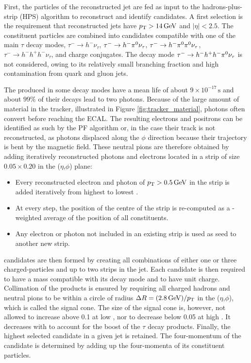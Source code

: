 First, the particles of the reconstructed jet are fed as input to the hadrons-plus-strip (HPS) algorithm \cite{tauh_reconstruction} to reconstruct and identify \tauh candidates. A first selection is the requirement that reconstructed jets have $p_{\mathrm{T}} > 14\,\mathrm{GeV}$ and $|\eta| < 2.5$.
The constituent particles are combined into \tauh candidates compatible with one of the main $\tau$ decay modes, $\tau^- \rightarrow h^- \nu_\tau$, $\tau^- \rightarrow h^- \pi^{0} \nu_\tau$, $\tau^- \rightarrow h^- \pi^{0} \pi^{0} \nu_\tau$, $\tau^- \rightarrow h^- h^+ h^- \nu_\tau$, and charge conjugates. The decay mode $\tau^- \rightarrow h^- h^+ h^- \pi^{0} \nu_\tau$ is not considered, owing to its relatively small branching fraction and high contamination from quark and gluon jets.

The \pizero produced in some decay modes have a mean life of about $9 \times 10^{-17}\,\mathrm{s}$ and about $99\%$ of their decays lead to two photons. Because of the large amount of material in the tracker, illustrated in Figure \ref{fig:tracker_material}, photons often convert before reaching the ECAL. The resulting electrons and positrons can be identified as such by the PF algorithm or, in the case their track is not reconstructed, as photons displaced along the $\phi$ direction because their trajectory is bent by the magnetic field.
These neutral pions are therefore obtained by adding iteratively reconstructed photons and electrons located in a strip of size $0.05 \times 0.20$ in the ($\eta$,$\phi$) plane:
\begin{itemize}
    \item Every reconstructed electron and photon of $p_{\mathrm{T}} > 0.5\,\mathrm{GeV}$ in the strip is added iteratively from highest to lowest \pt.
    \item At every step, the position of the centre of the strip is re-computed as a \pt-weighted average of the position of all constituents.
    \item Any electron or photon not included in an existing strip is used as seed to another new strip.
\end{itemize}

\tauh candidates are then formed by creating all combinations of either one or three charged-particles and up to two strips in the jet.
Each \tauh candidate is then required to have a mass compatible with its decay mode and to have unit charge.
Collimation of the products is ensured by requiring all charged hadrons and neutral pions to be within a circle of radius $\Delta R = (2.8\,\mathrm{GeV})/p_{\mathrm{T}}$ in the ($\eta$,$\phi$), which is called the signal cone.
The size of the signal cone is, however, not allowed to increase above 0.1 at low \pt, nor to decrease below 0.05 at high \pt. It decreases with \pt to account for the boost of the $\tau$ decay products. Finally, the highest \pt selected \tauh candidate in a given jet is retained. The four-momentum of the \tauh candidate is determined by adding up the four-momenta of its constituent particles.

